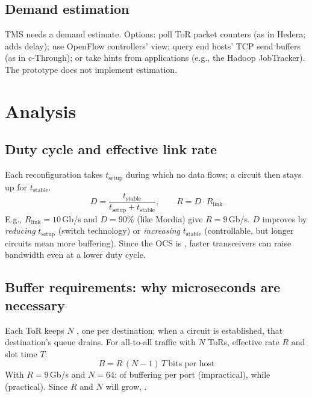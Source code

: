 \subsection{Demand estimation}
TMS needs a demand estimate. Options: poll ToR packet counters (as in Hedera; adds delay); use OpenFlow controllers' view; query end hosts' TCP send buffers (as in c-Through); or take hints from applications (e.g., the Hadoop JobTracker). The prototype does not implement estimation.

\section{Analysis}
\subsection{Duty cycle and effective link rate}
Each reconfiguration takes $t_{\text{setup}}$ during which no data flows; a circuit then stays up for $t_{\text{stable}}$.
\[ D=\frac{t_{\text{stable}}}{t_{\text{setup}}+t_{\text{stable}}}, \qquad R = D\cdot R_{\text{link}} \]
E.g., $R_{\text{link}}=10$\,Gb/s and $D=90\%$ (like Mordia) give $R=9$\,Gb/s. $D$ improves by \emph{reducing} $t_{\text{setup}}$ (switch technology) or \emph{increasing} $t_{\text{stable}}$ (controllable, but longer circuits mean more buffering). Since the OCS is , faster transceivers can raise bandwidth even at a lower duty cycle.

\subsection{Buffer requirements: why microseconds are necessary}
Each ToR keeps $N$ , one per destination; when a circuit is established, that destination's queue drains. For all-to-all traffic with $N$ ToRs, effective rate $R$ and slot time $T$:
\[ B = R\,(N-1)\,T \ \text{bits per host} \]
With $R=9$\,Gb/s and $N=64$:  of buffering per port (impractical), while  (practical). Since $R$ and $N$ will grow, .


